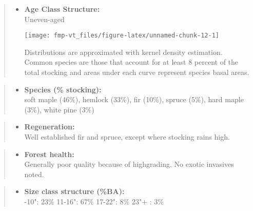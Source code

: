 \documentclass[]{tufte-handout}
\providecommand{\tightlist}{%
  \setlength{\itemsep}{0pt}\setlength{\parskip}{0pt}}
\begin{document}
\begin{quote}
\begin{itemize}
\tightlist
\item
  \textbf{Age Class Structure:}\\
  \vspace{2pt} Uneven-aged\\

  \begin{marginfigure}
  \texttt{[image: fmp-vt\_files/figure-latex/unnamed-chunk-12-1]} \caption[Distributions are approximated with kernel density estimation]{Distributions are approximated with kernel density estimation. Common species are those that account for at least 8 percent of the total stocking and areas under each curve represent species basal areas.}\label{fig:unnamed-chunk-12}
  \end{marginfigure}
\end{itemize}
\end{quote}

\begin{quote}
\begin{itemize}
\tightlist
\item
  \textbf{Species (\% stocking):}\\
  \vspace{2pt} soft maple (46\%), hemlock (33\%), fir (10\%), spruce
  (5\%), hard maple (3\%), white pine (3\%)
\end{itemize}
\end{quote}

\begin{quote}
\begin{itemize}
\tightlist
\item
  \textbf{Regeneration:}\\
  \vspace{2pt} Well established fir and spruce, except where stocking
  rains high.
\end{itemize}
\end{quote}

\begin{quote}
\begin{itemize}
\tightlist
\item
  \textbf{Forest health:}\\
  \vspace{2pt} Generally poor quality because of highgrading. No exotic
  invasives noted.
\end{itemize}
\end{quote}

\begin{quote}
\begin{itemize}
\tightlist
\item
  \textbf{Size class structure (\%BA):}\\
  \vspace{2pt} -10": 23\% \textbar{} 11-16": 67\% \textbar{}
  17-22": 8\% \textbar{} 23"+ : 3\%
\end{itemize}
\end{quote}
\end{document}
